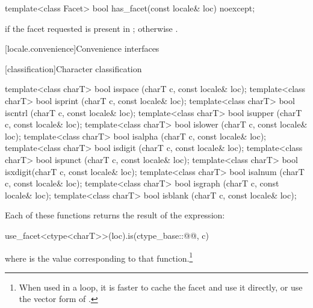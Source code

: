 %
\begin{itemdecl}
template<class Facet> bool has_facet(const locale& loc) noexcept;
\end{itemdecl}

\begin{itemdescr}
\pnum
\returns
{} if the facet requested is present in ; otherwise .
\end{itemdescr}

[locale.convenience]{Convenience interfaces}

[classification]{Character classification}

%
%
%
%
%
%
%
%
%
%
%
%
\begin{itemdecl}
template<class charT> bool isspace (charT c, const locale& loc);
template<class charT> bool isprint (charT c, const locale& loc);
template<class charT> bool iscntrl (charT c, const locale& loc);
template<class charT> bool isupper (charT c, const locale& loc);
template<class charT> bool islower (charT c, const locale& loc);
template<class charT> bool isalpha (charT c, const locale& loc);
template<class charT> bool isdigit (charT c, const locale& loc);
template<class charT> bool ispunct (charT c, const locale& loc);
template<class charT> bool isxdigit(charT c, const locale& loc);
template<class charT> bool isalnum (charT c, const locale& loc);
template<class charT> bool isgraph (charT c, const locale& loc);
template<class charT> bool isblank (charT c, const locale& loc);
\end{itemdecl}

\pnum
Each of these functions
returns the result of the expression:

\begin{codeblock}
use_facet<ctype<charT>>(loc).is(ctype_base::@@, c)
\end{codeblock}

where  is the
value corresponding to that function.\footnote{When
used in a loop, it is faster to cache the
facet and use it directly, or use the vector form of
.}

